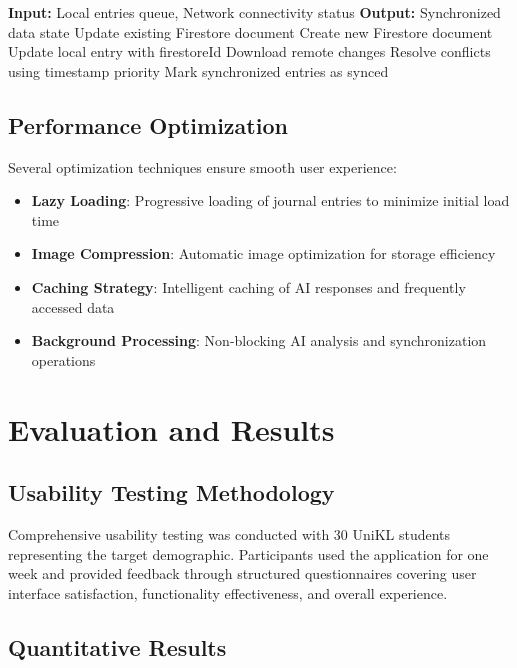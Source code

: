 \documentclass[conference]{IEEEtran}
\begin{document}
\begin{algorithmic}
\STATE \textbf{Input:} Local entries queue, Network connectivity status
\STATE \textbf{Output:} Synchronized data state
            \STATE Update existing Firestore document
        \ELSE
            \STATE Create new Firestore document
            \STATE Update local entry with firestoreId
        \ENDIF
    \ENDFOR
    \STATE Download remote changes
    \STATE Resolve conflicts using timestamp priority
\ENDIF
\STATE Mark synchronized entries as synced
\end{algorithmic}

\subsection{Performance Optimization}

Several optimization techniques ensure smooth user experience:
\begin{itemize}
\item \textbf{Lazy Loading}: Progressive loading of journal entries to minimize initial load time
\item \textbf{Image Compression}: Automatic image optimization for storage efficiency
\item \textbf{Caching Strategy}: Intelligent caching of AI responses and frequently accessed data
\item \textbf{Background Processing}: Non-blocking AI analysis and synchronization operations
\end{itemize}

\section{Evaluation and Results}

\subsection{Usability Testing Methodology}

Comprehensive usability testing was conducted with 30 UniKL students representing the target demographic. Participants used the application for one week and provided feedback through structured questionnaires covering user interface satisfaction, functionality effectiveness, and overall experience.

\subsection{Quantitative Results}
\end{document}
